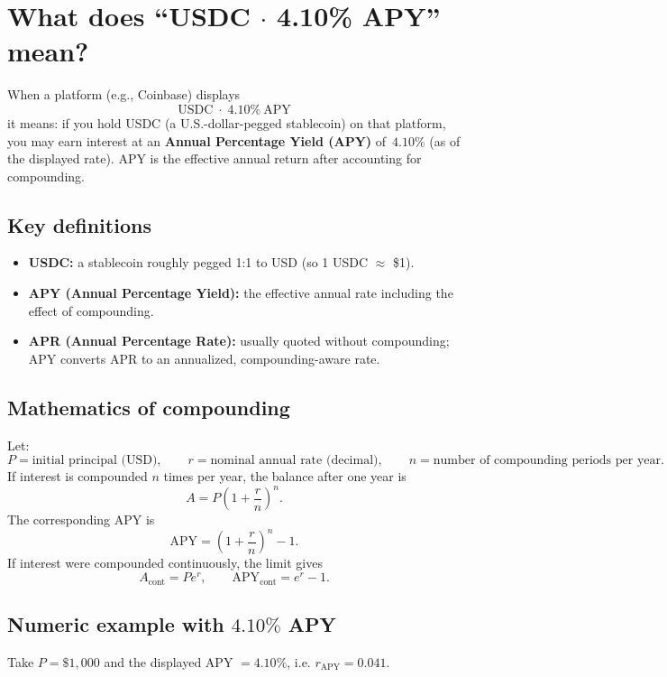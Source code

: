 \documentclass{article}
\begin{document}
\newpage

\section*{What does ``USDC \(\cdot\) 4.10\% APY'' mean?}

When a platform (e.g., Coinbase) displays
\[
\text{USDC}\;\cdot\;4.10\%\ \text{APY}
\]
it means: if you hold USDC (a U.S.-dollar-pegged stablecoin) on that platform, you may earn interest at an \textbf{Annual Percentage Yield (APY)} of \(\,4.10\%\) (as of the displayed rate). APY is the effective annual return after accounting for compounding.

\bigskip

\subsection*{Key definitions}
\begin{itemize}
  \item \textbf{USDC:} a stablecoin roughly pegged 1:1 to USD (so 1 USDC \(\approx\) \$1).
  \item \textbf{APY (Annual Percentage Yield):} the effective annual rate including the effect of compounding.
  \item \textbf{APR (Annual Percentage Rate):} usually quoted without compounding; APY converts APR to an annualized, compounding-aware rate.
\end{itemize}

\subsection*{Mathematics of compounding}
Let:
\[
P = \text{initial principal (USD)}, \qquad r = \text{nominal annual rate (decimal)}, \qquad n = \text{number of compounding periods per year}.
\]
If interest is compounded \(n\) times per year, the balance after one year is
\[
A = P\left(1+\frac{r}{n}\right)^{n}.
\]
The corresponding APY is
\[
\text{APY} = \left(1+\frac{r}{n}\right)^{n} - 1.
\]
If interest were compounded continuously, the limit gives
\[
A_{\text{cont}} = Pe^{r},\qquad \text{APY}_{\text{cont}} = e^{r}-1.
\]

\bigskip

\subsection*{Numeric example with \(\mathbf{4.10\%}\) APY}
Take \(P=\$1{,}000\) and the displayed APY \(=4.10\%\), i.e. \(r_{\text{APY}}=0.041\).
\end{document}
